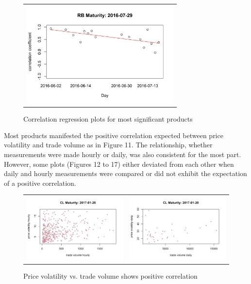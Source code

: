 \documentclass[12pt]{article}
\begin{document}
\begin{figure}[H]
\begin{center}
\begin{tabular}{ll}
			\multicolumn{2}{c}{\includegraphics[width=8cm]{Coeff_fitRB2016-07-29.png}}
		\end{tabular}
	\end{center}
	\caption{Correlation regression plots for most significant products}
	\label{fig:10}
\end{figure}

Most products manifested the positive correlation expected between price volatility and trade volume as in Figure 11. The relationship, whether measurements were made hourly or daily, was also consistent for the most part. However, some plots (Figures 12 to 17) either deviated from each other when daily and hourly measurements were compared or did not exhibit the expectation of a positive correlation.

\begin{figure}[H]
	\begin{center}
		\begin{tabular}{ll}
			\includegraphics[width=8cm]{CL2017-01-20hourly.png} &
			\includegraphics[width=8cm]{CL2017-01-20daily.png} \\
		\end{tabular}
	\end{center}
	\caption{Price volatility vs. trade volume shows positive correlation}
	\label{fig: 11}
\end{figure}
\end{document}
